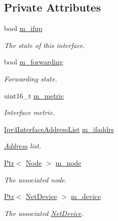 \subsection*{Private Attributes}
\begin{DoxyCompactItemize}
\item 
bool \hyperlink{classns3_1_1Ipv4Interface_ae57ec1ab551108d7f78aa10135e14c90}{m\+\_\+ifup}
\begin{DoxyCompactList}\small\item\em The state of this interface. \end{DoxyCompactList}\item 
bool \hyperlink{classns3_1_1Ipv4Interface_a4cc4010f5d732b0602db968be2d4f0d3}{m\+\_\+forwarding}
\begin{DoxyCompactList}\small\item\em Forwarding state. \end{DoxyCompactList}\item 
uint16\+\_\+t \hyperlink{classns3_1_1Ipv4Interface_a8f23bb2ff1470e29ba298169b38fb1c1}{m\+\_\+metric}
\begin{DoxyCompactList}\small\item\em Interface metric. \end{DoxyCompactList}\item 
\hyperlink{classns3_1_1Ipv4Interface_aee3862b3d3b286dd3c950fdc0c8c9420}{Ipv4\+Interface\+Address\+List} \hyperlink{classns3_1_1Ipv4Interface_a8a8497e4a1acab91a66b9054d63df9f9}{m\+\_\+ifaddrs}
\begin{DoxyCompactList}\small\item\em \hyperlink{classns3_1_1Address}{Address} list. \end{DoxyCompactList}\item 
\hyperlink{classns3_1_1Ptr}{Ptr}$<$ \hyperlink{classns3_1_1Node}{Node} $>$ \hyperlink{classns3_1_1Ipv4Interface_a1790f3e2892779803599e5b7bb1fcbc9}{m\+\_\+node}
\begin{DoxyCompactList}\small\item\em The associated node. \end{DoxyCompactList}\item 
\hyperlink{classns3_1_1Ptr}{Ptr}$<$ \hyperlink{classns3_1_1NetDevice}{Net\+Device} $>$ \hyperlink{classns3_1_1Ipv4Interface_a67b77c15bcf3fb402c179796e04646b2}{m\+\_\+device}
\begin{DoxyCompactList}\small\item\em The associated \hyperlink{classns3_1_1NetDevice}{Net\+Device}. \end{DoxyCompactList}\item 

\end{DoxyCompactItemize}
